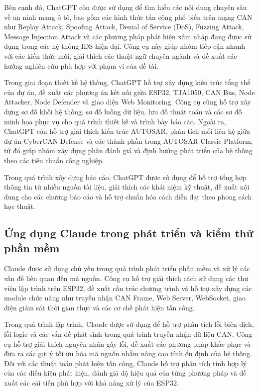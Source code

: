Bên cạnh đó, ChatGPT còn được sử dụng để tìm hiểu các nội dung chuyên sâu về an ninh mạng ô tô, bao gồm các hình thức tấn công phổ biến trên mạng CAN như Replay Attack, Spoofing Attack, Denial of Service (DoS), Fuzzing Attack, Message Injection Attack và các phương pháp phát hiện xâm nhập đang được sử dụng trong các hệ thống IDS hiện đại. Công cụ này giúp nhóm tiếp cận nhanh với các kiến thức mới, giải thích các thuật ngữ chuyên ngành và đề xuất các hướng nghiên cứu phù hợp với phạm vi của đề tài.

Trong giai đoạn thiết kế hệ thống, ChatGPT hỗ trợ xây dựng kiến trúc tổng thể của dự án, đề xuất các phương án kết nối giữa ESP32, TJA1050, CAN Bus, Node Attacker, Node Defender và giao diện Web Monitoring. Công cụ cũng hỗ trợ xây dựng sơ đồ khối hệ thống, sơ đồ luồng dữ liệu, lưu đồ thuật toán và các sơ đồ minh họa phục vụ cho quá trình thiết kế và trình bày báo cáo. Ngoài ra, ChatGPT còn hỗ trợ giải thích kiến trúc AUTOSAR, phân tích mối liên hệ giữa dự án CyberCAN Defense và các thành phần trong AUTOSAR Classic Platform, từ đó giúp nhóm xây dựng phần đánh giá và định hướng phát triển của hệ thống theo các tiêu chuẩn công nghiệp.

Trong quá trình xây dựng báo cáo, ChatGPT được sử dụng để hỗ trợ tổng hợp thông tin từ nhiều nguồn tài liệu, giải thích các khái niệm kỹ thuật, đề xuất nội dung cho các chương báo cáo và hỗ trợ chuẩn hóa cách diễn đạt theo phong cách học thuật.

\subsection{Ứng dụng Claude trong phát triển và kiểm thử phần mềm}

Claude được sử dụng chủ yếu trong quá trình phát triển phần mềm và xử lý các vấn đề liên quan đến mã nguồn. Công cụ hỗ trợ giải thích cách sử dụng các thư viện lập trình trên ESP32, đề xuất cấu trúc chương trình và hỗ trợ xây dựng các module chức năng như truyền nhận CAN Frame, Web Server, WebSocket, giao diện giám sát thời gian thực và các cơ chế phát hiện tấn công.

Trong quá trình lập trình, Claude được sử dụng để hỗ trợ phân tích lỗi biên dịch, lỗi logic và các vấn đề phát sinh trong quá trình truyền nhận dữ liệu CAN. Công cụ hỗ trợ giải thích nguyên nhân gây lỗi, đề xuất các phương pháp khắc phục và đưa ra các gợi ý tối ưu hóa mã nguồn nhằm nâng cao tính ổn định của hệ thống. Đối với các thuật toán phát hiện tấn công, Claude hỗ trợ phân tích tính hợp lý của các điều kiện phát hiện, đánh giá độ hiệu quả của từng phương pháp và đề xuất các cải tiến phù hợp với khả năng xử lý của ESP32.

